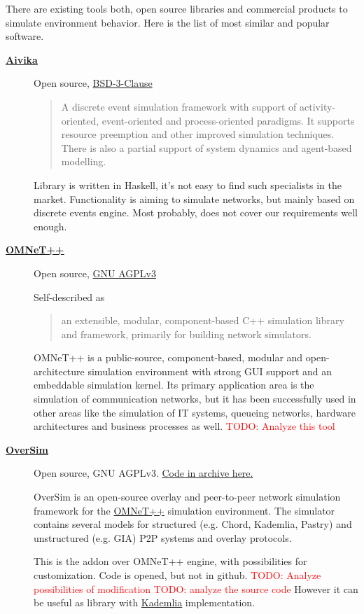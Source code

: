 \documentclass[12pt,oneside]{article}
\newcommand{\todo}[1]{\textcolor{red}{TODO: #1}}
\begin{document}
There are existing tools both, open source libraries and commercial products to simulate environment behavior. Here is the list of most similar and popular software.\par
\begin{description}
  \item[\href{https://github.com/dsorokin/aivika}{\textbf{Aivika}}]
Open source, \href{https://hackage.haskell.org/package/aivika-5.9/src/LICENSE}{BSD-3-Clause}
    \begin{quote}
A discrete event simulation framework with support of activity-oriented, event-oriented and process-oriented paradigms. It supports resource preemption and other improved simulation techniques. There is also a partial support of system dynamics and agent-based modelling.
    \end{quote}
Library is written in Haskell, it's not easy to find such specialists in the market. Functionality is aiming to simulate networks, but mainly based on discrete events engine. Most probably, does not cover our requirements well enough.

  \item[\href{https://omnetpp.org/}{\textbf{OMNeT++}}]
Open source, \href{https://github.com/omnetpp/omnetpp}{GNU AGPLv3}\par
Self-described as 
    \begin{quote}
        an extensible, modular, component-based C++ simulation library and framework, primarily for building network simulators.
    \end{quote}
OMNeT++ is a public-source, component-based, modular and open-architecture simulation environment with strong GUI support and an embeddable simulation kernel. Its primary application area is the simulation of communication networks, but it has been successfully used in other areas like the simulation of IT systems, queueing networks, hardware architectures and business processes as well.
\todo{Analyze this tool}

  \item[\href{http://www.oversim.org/wiki}{\textbf{OverSim}}]
Open source, GNU AGPLv3. \href{http://www.oversim.org/wiki/OverSimDownload}{Code in archive here.}

OverSim is an open-source overlay and peer-to-peer network simulation framework for the \href{https://omnetpp.org/}{OMNeT++} simulation environment. The simulator contains several models for structured (e.g. Chord, Kademlia, Pastry) and unstructured (e.g. GIA) P2P systems and overlay protocols.\par
This is the addon over OMNeT++ engine, with possibilities for customization. Code is opened, but not in github. \todo{Analyze possibilities of modification}
\todo{analyze the source code}
However it can be useful as library with \href{https://en.wikipedia.org/wiki/Kademlia}{Kademlia} implementation.


\end{description}
\end{document}

